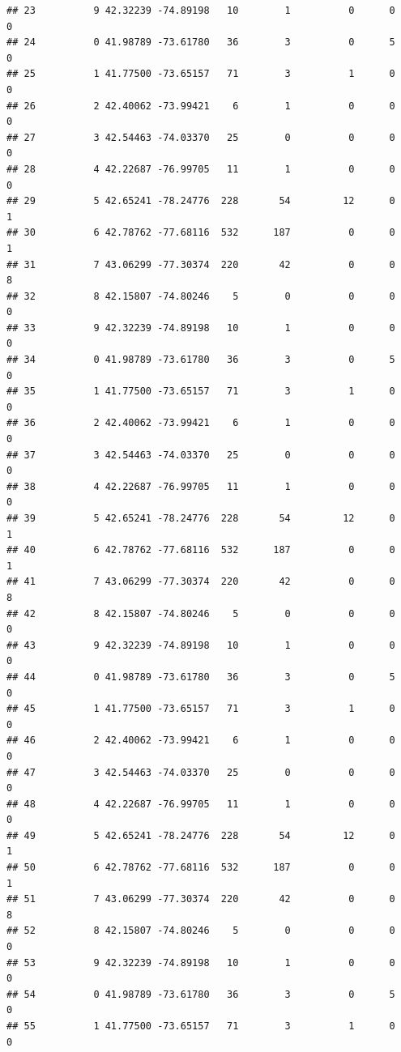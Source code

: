 \documentclass[
]{article}
\begin{document}
\begin{verbatim}
## 23          9 42.32239 -74.89198   10        1          0      0            0
## 24          0 41.98789 -73.61780   36        3          0      5            0
## 25          1 41.77500 -73.65157   71        3          1      0            0
## 26          2 42.40062 -73.99421    6        1          0      0            0
## 27          3 42.54463 -74.03370   25        0          0      0            0
## 28          4 42.22687 -76.99705   11        1          0      0            0
## 29          5 42.65241 -78.24776  228       54         12      0            1
## 30          6 42.78762 -77.68116  532      187          0      0            1
## 31          7 43.06299 -77.30374  220       42          0      0            8
## 32          8 42.15807 -74.80246    5        0          0      0            0
## 33          9 42.32239 -74.89198   10        1          0      0            0
## 34          0 41.98789 -73.61780   36        3          0      5            0
## 35          1 41.77500 -73.65157   71        3          1      0            0
## 36          2 42.40062 -73.99421    6        1          0      0            0
## 37          3 42.54463 -74.03370   25        0          0      0            0
## 38          4 42.22687 -76.99705   11        1          0      0            0
## 39          5 42.65241 -78.24776  228       54         12      0            1
## 40          6 42.78762 -77.68116  532      187          0      0            1
## 41          7 43.06299 -77.30374  220       42          0      0            8
## 42          8 42.15807 -74.80246    5        0          0      0            0
## 43          9 42.32239 -74.89198   10        1          0      0            0
## 44          0 41.98789 -73.61780   36        3          0      5            0
## 45          1 41.77500 -73.65157   71        3          1      0            0
## 46          2 42.40062 -73.99421    6        1          0      0            0
## 47          3 42.54463 -74.03370   25        0          0      0            0
## 48          4 42.22687 -76.99705   11        1          0      0            0
## 49          5 42.65241 -78.24776  228       54         12      0            1
## 50          6 42.78762 -77.68116  532      187          0      0            1
## 51          7 43.06299 -77.30374  220       42          0      0            8
## 52          8 42.15807 -74.80246    5        0          0      0            0
## 53          9 42.32239 -74.89198   10        1          0      0            0
## 54          0 41.98789 -73.61780   36        3          0      5            0
## 55          1 41.77500 -73.65157   71        3          1      0            0

\end{verbatim}
\end{document}
